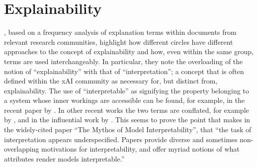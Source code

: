 \section{Explainability} \label{sec:explainability}
\cite{Doran2018}, based on a frequency analysis of explanation terms within documents from relevant research communities, highlight how different circles have different approaches to the concept of explainability and how, even within the same group, terms are used interchangeably.
In particular, they note the overloading of the notion of \enquote{explainability} with that of \enquote{interpretation}; a concept that is often defined within the xAI community as necessary for, but distinct from, explainability.
The use of \enquote{interpretable} as signifying the property belonging to a system whose inner workings are accessible can be found, for example, in the recent paper by \cite{gilpin2018explaining}.
In other recent works the two terms are conflated, for example by \cite{mittelstadt2019explaining}, \cite{guidotti2018survey} and in the influential work by \cite{doshi2017towards}.
This seems to prove the point that \cite{Lipton2016} makes in the widely-cited paper \enquote{The Mythos of Model Interpretability}, that \enquote{the task of interpretation appears underspecified. Papers provide diverse and sometimes non-overlapping motivations for interpretability, and offer myriad notions of what attributes render models interpretable.}

